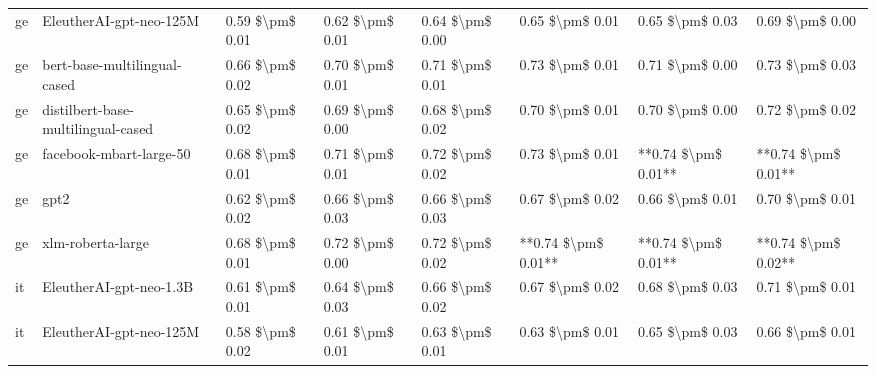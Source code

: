 \begin{tabular}{llllllll}
      ge &            EleutherAI-gpt-neo-125M & 0.59 \$\textbackslash pm\$ 0.01 &           0.62 \$\textbackslash pm\$ 0.01 &       0.64 \$\textbackslash pm\$ 0.00 &        0.65 \$\textbackslash pm\$ 0.01 &                         0.65 \$\textbackslash pm\$ 0.03 &     0.69 \$\textbackslash pm\$ 0.00 \\
      ge &       bert-base-multilingual-cased & 0.66 \$\textbackslash pm\$ 0.02 &           0.70 \$\textbackslash pm\$ 0.01 &       0.71 \$\textbackslash pm\$ 0.01 &        0.73 \$\textbackslash pm\$ 0.01 &                         0.71 \$\textbackslash pm\$ 0.00 &     0.73 \$\textbackslash pm\$ 0.03 \\
      ge & distilbert-base-multilingual-cased & 0.65 \$\textbackslash pm\$ 0.02 &           0.69 \$\textbackslash pm\$ 0.00 &       0.68 \$\textbackslash pm\$ 0.02 &        0.70 \$\textbackslash pm\$ 0.01 &                         0.70 \$\textbackslash pm\$ 0.00 &     0.72 \$\textbackslash pm\$ 0.02 \\
      ge &            facebook-mbart-large-50 & 0.68 \$\textbackslash pm\$ 0.01 &           0.71 \$\textbackslash pm\$ 0.01 &       0.72 \$\textbackslash pm\$ 0.02 &        0.73 \$\textbackslash pm\$ 0.01 &                     **0.74 \$\textbackslash pm\$ 0.01** & **0.74 \$\textbackslash pm\$ 0.01** \\
      ge &                               gpt2 & 0.62 \$\textbackslash pm\$ 0.02 &           0.66 \$\textbackslash pm\$ 0.03 &       0.66 \$\textbackslash pm\$ 0.03 &        0.67 \$\textbackslash pm\$ 0.02 &                         0.66 \$\textbackslash pm\$ 0.01 &     0.70 \$\textbackslash pm\$ 0.01 \\
      ge &                  xlm-roberta-large & 0.68 \$\textbackslash pm\$ 0.01 &           0.72 \$\textbackslash pm\$ 0.00 &       0.72 \$\textbackslash pm\$ 0.02 &    **0.74 \$\textbackslash pm\$ 0.01** &                     **0.74 \$\textbackslash pm\$ 0.01** & **0.74 \$\textbackslash pm\$ 0.02** \\
      it &            EleutherAI-gpt-neo-1.3B & 0.61 \$\textbackslash pm\$ 0.01 &           0.64 \$\textbackslash pm\$ 0.03 &       0.66 \$\textbackslash pm\$ 0.02 &        0.67 \$\textbackslash pm\$ 0.02 &                         0.68 \$\textbackslash pm\$ 0.03 &     0.71 \$\textbackslash pm\$ 0.01 \\
      it &            EleutherAI-gpt-neo-125M & 0.58 \$\textbackslash pm\$ 0.02 &           0.61 \$\textbackslash pm\$ 0.01 &       0.63 \$\textbackslash pm\$ 0.01 &        0.63 \$\textbackslash pm\$ 0.01 &                         0.65 \$\textbackslash pm\$ 0.03 &     0.66 \$\textbackslash pm\$ 0.01 \\

\end{tabular}
